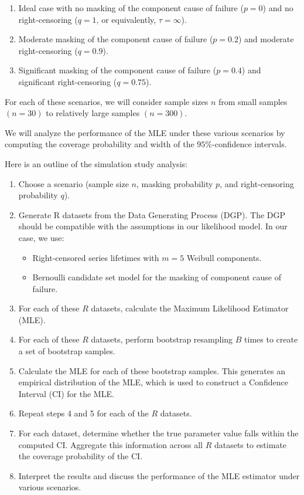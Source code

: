 \documentclass[
]{article}
\begin{document}
\begin{enumerate}
\def\labelenumi{\arabic{enumi}.}
\item
  Ideal case with no masking of the component cause of failure
  (\(p = 0\)) and no right-censoring (\(q = 1\), or equivalently,
  \(\tau = \infty\)).
\item
  Moderate masking of the component cause of failure (\(p = 0.2\)) and
  moderate right-censoring (\(q = 0.9\)).
\item
  Significant masking of the component cause of failure (\(p = 0.4\))
  and significant right-censoring (\(q = 0.75\)).
\end{enumerate}

For each of these scenarios, we will consider sample sizes \(n\) from
small samples \((n = 30)\) to relatively large samples \((n = 300)\).

We will analyze the performance of the MLE under these various scenarios
by computing the coverage probability and width of the
\(95\%\)-confidence intervals.

Here is an outline of the simulation study analysis:

\begin{enumerate}
\def\labelenumi{\arabic{enumi}.}
\item
  Choose a scenario (sample size \(n\), masking probability \(p\), and
  right-censoring probability \(q\)).
\item
  Generate R datasets from the Data Generating Process (DGP). The DGP
  should be compatible with the assumptions in our likelihood model. In
  our case, we use:

  \begin{itemize}
  \item
    Right-censored series lifetimes with \(m = 5\) Weibull components.
  \item
    Bernoulli candidate set model for the masking of component cause of
    failure.
  \end{itemize}
\item
  For each of these \(R\) datasets, calculate the Maximum Likelihood
  Estimator (MLE).
\item
  For each of these \(R\) datasets, perform bootstrap resampling \(B\)
  times to create a set of bootstrap samples.
\item
  Calculate the MLE for each of these bootstrap samples. This generates
  an empirical distribution of the MLE, which is used to construct a
  Confidence Interval (CI) for the MLE.
\item
  Repeat steps 4 and 5 for each of the \(R\) datasets.
\item
  For each dataset, determine whether the true parameter value falls
  within the computed CI. Aggregate this information across all \(R\)
  datasets to estimate the coverage probability of the CI.
\item
  Interpret the results and discuss the performance of the MLE estimator
  under various scenarios.
\end{enumerate}
\end{document}
